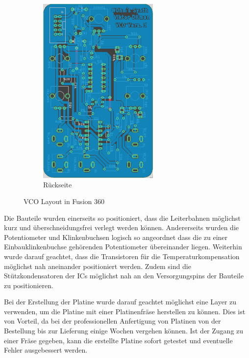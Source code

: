 \begin{figure}[h]
\begin{subfigure}{.5\textwidth}
		\includegraphics[width=0.65\textwidth]{figures/VCO_Layout_Back}
		\caption{Rückseite}
		\label{fig:VCO_Leiterplatte_hinten}
	\end{subfigure}
	\caption{VCO Layout in Fusion 360}
	\label{fig:VCO Layout}
\end{figure}

Die Bauteile wurden einerseits so positioniert, dass die Leiterbahnen möglichst kurz und überschneidungsfrei verlegt werden können.
Andererseits wurden die Potentiometer und Klinkenbuchsen logisch so angeordnet dass die zu einer Einbauklinkenbuchse gehörenden Potentiometer übereinander liegen.
Weiterhin wurde darauf geachtet, dass die Transistoren für die Temperaturkompensation möglichst nah aneinander positioniert werden.
Zudem sind die Stützkondensatoren der ICs möglichst nah an den Versorgungspins der Bauteile zu positionieren.

Bei der Erstellung der Platine wurde darauf geachtet möglichst eine Layer zu verwenden, um die Platine mit einer Platinenfräse herstellen zu können.
Dies ist von Vorteil, da bei der professionellen Anfertigung von Platinen von der Bestellung bis zur Lieferung einige Wochen vergehen können.
Ist der Zugang zu einer Fräse gegeben, kann die erstellte Platine sofort getestet und eventuelle Fehler ausgebessert werden.

